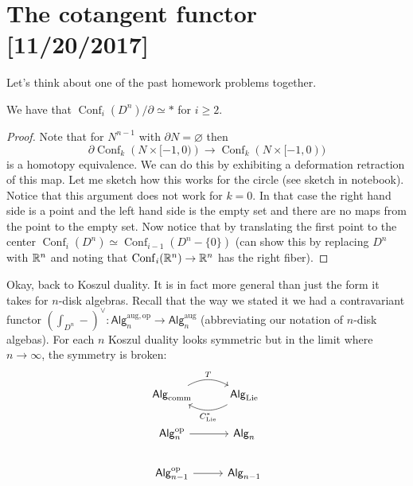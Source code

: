 \documentclass{amsart}
\DeclareMathOperator{\Conf}{Conf}
\newcommand{\op}{\mathrm{op}}
\newcommand{\aug}{\mathrm{aug}}
\begin{document}
\section{The cotangent functor [11/20/2017]}

Let's think about one of the past homework problems together.
\begin{lemma}
    We have that $\Conf_i(D^n)/\partial\simeq *$ for $i\geq 2$.
\end{lemma}
\begin{proof}
    Note that for $N^{n-1}$ with $\partial N=\varnothing$ then
    \begin{equation*}
        \partial\Conf_k\left( N\times [-1,0) \right)\to \Conf_k(N\times[-1,0))
    \end{equation*}
    is a homotopy equivalence. We can do this by exhibiting a deformation retraction
    of this map. Let me sketch how this works for the circle (see sketch in notebook).
    Notice that this argument does not work for $k=0$. In that case the right hand
    side is a point and the left hand side is the empty set and there are no maps from
    the point to the empty set. Now notice that by translating the first point to
    the center $\Conf_i(D^n)\simeq\Conf_{i-1}(D^n-\{0\})$ (can show this by replacing
    $D^n$ with $\mathbb{R}^n$ and noting that $\Conf_i(\R^n)\to\R^n$ has the right fiber).
\end{proof}

Okay, back to Koszul duality. It is in fact more general than just the form
it takes for $n$-disk algebras. Recall that the way we stated it we had a contravariant
functor $(\int_{D^n}-)^\vee:\mathsf{Alg}_n^{\aug,\op}\to\mathsf{Alg}_n^{\aug}$ (abbreviating
our notation of $n$-disk algebas).
For each $n$ Koszul duality looks symmetric but in the limit where $n\to\infty$, the symmetry is broken:
\begin{equation*}
    \begin{tikzcd}
        \mathsf{Alg}_\text{comm} \rar[bend left]{T} & \mathsf{Alg}_\text{Lie}\lar[bend left]{C^*_\text{Lie}} \\
        \mathsf{Alg}_n^\text{op} \rar & \mathsf{Alg}_n \\
        \mathsf{Alg}_{n-1}^\text{op} \rar  & \mathsf{Alg}_{n-1}
    \end{tikzcd}
\end{equation*}
\end{document}

